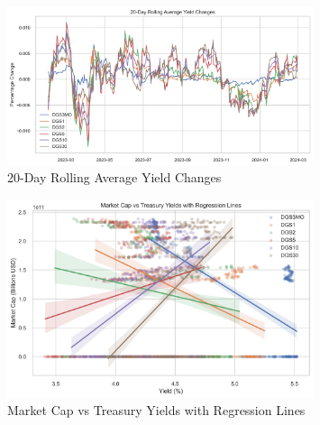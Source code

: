 \documentclass[12pt,a4paper]{article}
\begin{document}
\begin{figure}[H]
    \centering
    \includegraphics[width=0.8\textwidth]{figures/yield_changes.png}
    \caption{20-Day Rolling Average Yield Changes}
    \label{fig:yield_changes}
\end{figure}

\begin{figure}[H]
    \centering
    \includegraphics[width=0.8\textwidth]{figures/market_cap_vs_all_yields.png}
    \caption{Market Cap vs Treasury Yields with Regression Lines}
    \label{fig:regression}
\end{figure}
\end{document}
